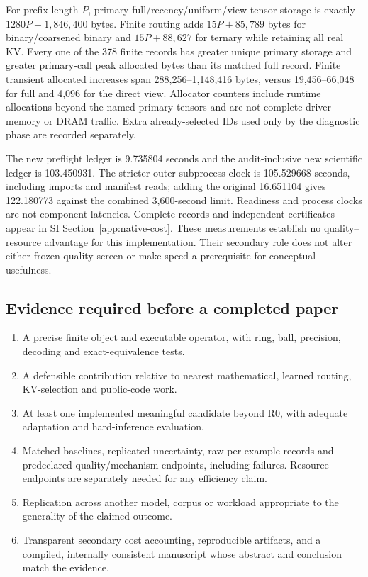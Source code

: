 \documentclass[11pt]{article}
\begin{document}
For prefix length \(P\), primary full/recency/uniform/view tensor storage
is exactly \(1280P+1{,}846{,}400\) bytes. Finite routing adds
\(15P+85{,}789\) bytes for binary/coarsened binary and
\(15P+88{,}627\) for ternary while retaining all real KV.
Every one of the 378 finite records has greater unique primary storage and
greater primary-call peak allocated bytes than its matched full record.
Finite transient allocated increases span 288,256--1,148,416 bytes, versus
19,456--66,048 for full and 4,096 for the direct view. Allocator counters
include runtime allocations beyond the named primary tensors and are not
complete driver memory or DRAM traffic. Extra already-selected IDs used
only by the diagnostic phase are recorded separately.

The new preflight ledger is 9.735804 seconds and the audit-inclusive new
scientific ledger is 103.450931. The stricter outer subprocess clock is
105.529668 seconds, including imports and manifest reads; adding the original
16.651104 gives 122.180773 against the combined 3,600-second limit.
Readiness and process clocks are not component latencies. Complete records
and independent certificates appear in SI Section~\ref{app:native-cost}.
These measurements establish no quality--resource advantage for this
implementation. Their secondary role does not alter either frozen quality
screen or make speed a prerequisite for conceptual usefulness.

\subsection{Evidence required before a completed paper}

\begin{enumerate}
\item A precise finite object and executable operator, with ring, ball,
precision, decoding and exact-equivalence tests.
\item A defensible contribution relative to nearest mathematical, learned
routing, KV-selection and public-code work.
\item At least one implemented meaningful candidate beyond R0, with adequate
adaptation and hard-inference evaluation.
\item Matched baselines, replicated uncertainty, raw per-example records and
predeclared quality/mechanism endpoints, including failures. Resource endpoints
are separately needed for any efficiency claim.
\item Replication across another model, corpus or workload appropriate to the
generality of the claimed outcome.
\item Transparent secondary cost accounting, reproducible artifacts, and a compiled,
internally consistent manuscript whose abstract and conclusion match the evidence.
\end{enumerate}
\end{document}
